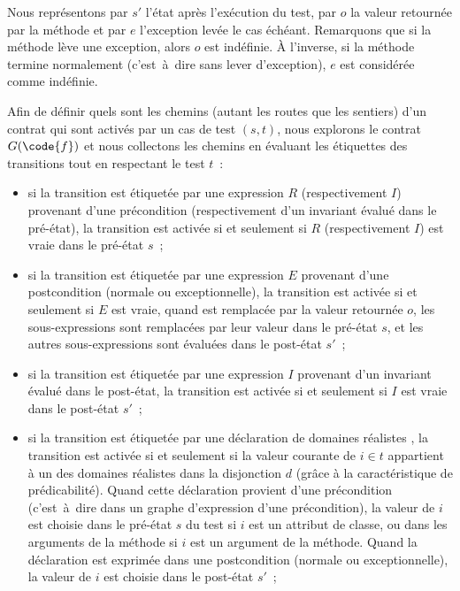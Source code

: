 Nous représentons par $s'$ l'état après l'exécution du test, par $o$ la valeur
retournée par la méthode  et par $e$ l'exception levée le cas échéant.
Remarquons que si la méthode lève une exception, alors $o$ est indéfinie. À
l'inverse, si la méthode termine normalement (c'est~à~dire sans lever
d'exception), $e$ est considérée comme indéfinie.

Afin de définir quels sont les chemins (autant les routes que les sentiers) d'un
contrat qui sont activés par un cas de test $(s, t)$, nous explorons le contrat
$G(\code{f})$ et nous collectons les chemins en évaluant les étiquettes des
transitions tout en respectant le test $t$~:
%
\begin{itemize}

\item si la transition est étiquetée par une expression $R$ (respectivement
$I$) provenant d'une précondition (respectivement d'un invariant évalué dans le
pré-état), la transition est activée si et seulement si $R$ (respectivement $I$)
est vraie dans le pré-état $s$~;

\item si la transition est étiquetée par une expression $E$ provenant d'une
postcondition (normale ou exceptionnelle), la transition est activée si et
seulement si $E$ est vraie, quand \aresult est remplacée par la valeur retournée
$o$, les sous-expressions \aold{\empty} sont remplacées par leur valeur dans le
pré-état $s$, et les autres sous-expressions sont évaluées dans le post-état
$s'$~;

\item si la transition est étiquetée par une expression $I$ provenant d'un
invariant évalué dans le post-état, la transition est activée si et seulement si
$I$ est vraie dans le post-état $s'$~;

\item si la transition est étiquetée par une déclaration de domaines réalistes
, la transition est activée si et seulement si la valeur courante
de $i \in t$ appartient à un des domaines réalistes dans la disjonction $d$
(grâce à la caractéristique de prédicabilité). Quand cette déclaration provient
d'une précondition (c'est~à~dire dans un graphe d'expression d'une
précondition), la valeur de $i$ est choisie dans le pré-état $s$ du test si $i$
est un attribut de classe, ou dans les arguments de la méthode si $i$ est un
argument de la méthode. Quand la déclaration est exprimée dans une postcondition
(normale ou exceptionnelle), la valeur de $i$ est choisie dans le post-état
$s'$~;


\end{itemize}

